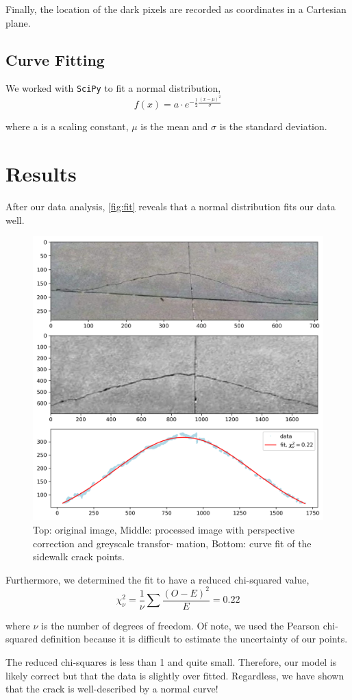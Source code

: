 \documentclass{article}
\begin{document}
Finally, the location of the dark pixels are recorded as coordinates in a Cartesian plane.
\subsection{Curve Fitting}
We worked with \texttt{SciPy} \cite{2020NumPy-Array} to fit a normal distribution,
\begin{equation}
f(x) = a \cdot e^{-\frac{1}{2}\frac{(x-\mu)^2}{\sigma}}
\end{equation}

where a is a scaling constant, $\mu$ is the mean and $\sigma$ is the standard deviation.

\section{Results}
After our data analysis, \autoref{fig:fit} reveals that a normal distribution fits our data well.
\begin{figure}[h]
    \includegraphics[width=13cm]{fit.png}
    \centering
    \caption{Top: original image, Middle: processed image with perspective correction and greyscale transfor- mation, Bottom: curve fit of the sidewalk crack points.}
    \label{fig:fit}
\end{figure}

Furthermore, we determined the fit to have a reduced chi-squared value,
\begin{equation}
\chi_\nu^2 = \frac{1}{\nu}\sum\frac{(O-E)^2}{E} = 0.22
\end{equation}

where $\nu$ is the number of degrees of freedom. Of note, we used the Pearson chi-squared definition because it is difficult to estimate the uncertainty of our points.

The reduced chi-squares is less than 1 and quite small. Therefore, our model is likely correct but that the data is slightly over fitted. Regardless, we have shown that the crack is well-described by a normal curve!



\nocite{*}
\end{document}
